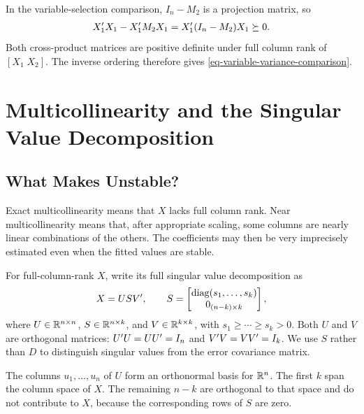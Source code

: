 \documentclass[a4paper,12pt]{article}
\begin{document}
In the variable-selection comparison, $I_n-M_2$ is a projection matrix, so
\begin{align*}
	X_1^{\prime} X_1-X_1^{\prime} M_2X_1
	=X_1^{\prime}(I_n-M_2)X_1\succeq0.
\end{align*}
Both cross-product matrices are positive definite under full column rank of $[X_1\;X_2]$.
The inverse ordering therefore gives \eqref{eq-variable-variance-comparison}.

\section{Multicollinearity and the Singular Value Decomposition}\label{sec-svd}

\subsection{What Makes  Unstable?}

Exact multicollinearity means that $X$ lacks full column rank.
Near multicollinearity means that, after appropriate scaling, some columns are nearly linear combinations of the others.
The coefficients may then be very imprecisely estimated even when the fitted values are stable.

For full-column-rank $X$, write its full singular value decomposition as
\begin{align}\label{eq-svd}
	X=USV^{\prime},
	\qquad S=\begin{bmatrix}
		\operatorname{diag}(s_1,\ldots,s_k)\\
		0_{(n-k)\times k}
	\end{bmatrix},
\end{align}
where $U\in\mathbb{R}^{n\times n}$, $S\in\mathbb{R}^{n\times k}$, and $V\in\mathbb{R}^{k\times k}$,
with $s_1\ge\cdots\ge s_k>0$.
Both $U$ and $V$ are orthogonal matrices:
$U^{\prime} U=UU^{\prime}=I_n$ and $V^{\prime} V=VV^{\prime}=I_k$.
We use $S$ rather than $D$ to distinguish singular values from the error covariance matrix.

\begin{remark}
	The columns $u_1,\ldots,u_n$ of $U$ form an orthonormal basis for $\mathbb{R}^n$.
	The first $k$ span the column space of $X$.
	The remaining $n-k$ are orthogonal to that space and do not contribute to $X$, because the corresponding rows of $S$ are zero.
\end{remark}
\end{document}
